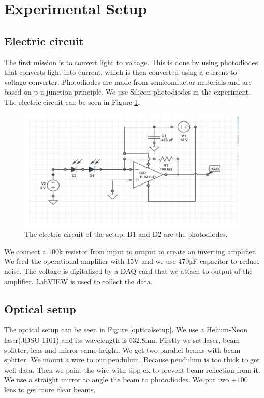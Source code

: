 \documentclass[11pt, a4paper]{article}
\begin{document}
\section{Experimental Setup}
\subsection{Electric circuit}
The first mission is to convert light to voltage. This is done by using photodiodes that converts light into current, which is then converted using a current-to-voltage converter.
Photodiodes are made from semiconductor materials and are based on p-n junction principle. We use Silicon photodiodes in the experiment. The electric circuit can be seen in Figure \ref{f:circuit}.
\begin{figure}[h]
	\centering
	\includegraphics{circuit}
	\caption{The electric circuit of the setup. D1 and D2 are the photodiodes.}
	\label{f:circuit}
\end{figure}

We connect a 100k resistor from input to output to create an inverting amplifier. We feed the operational amplifier with 15V and we use 470µF capacitor to reduce noise. The voltage is digitalized by a DAQ card that we attach to output of the amplifier. LabVIEW is used to collect the data.

\subsection{Optical setup}
The optical setup can be seen in Figure \ref{opticalsetup}. We use a Helium-Neon  laser(JDSU 1101) and its wavelength is 632,8nm. Firstly we set laser, beam splitter, lens and mirror same height. We get two parallel beams with beam splitter. 
We mount a wire to our pendulum. Because pendulum is too thick to get well data. Then we paint the wire with tipp-ex to prevent beam reflection from it. We use a straight mirror to angle the beam to photodiodes. We put two +100 lens to get more clear beams.
\end{document}
